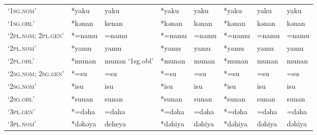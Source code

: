 \begin{landscape}
\begin{longtable}[c]{@{}p{3cm}<{\raggedright}p{2.75cm}<{\raggedright}p{2.75cm}<{\raggedright}p{2.75cm}<{\raggedright}p{2.75cm}<{\raggedright}p{2.75cm}<{\raggedright}p{2.75cm}<{\raggedright}p{2.75cm}<{\raggedright}@{}}
`\textsc{1sg.nom}'                                   & *yaku        & yaku                          & *yaku          & yaku                       & *yaku            & yaku                     & yaku                              \\
`\textsc{1sg.obl}'                                   & *kənan       & kenan                         & *kənan         & kənan                      & *kənan           & kənan                    & kənan                             \\
`\textsc{2pl.nom; 2pl.gen}'                          & *=namu       & =namu                         & *=namu         & =namu                      & *=namu           & =namu                    & =namu                             \\
`\textsc{2pl.nom}'                                   & *yamu        & yamu                          & *yamu          & yamu                       & *yamu            & yamu                     & yamu                              \\
`\textsc{2pl.obl}'                                   & *munan       & munan `1sg.obl'               & *munan         & munan                      & *munan           & munan                    & munan                             \\
`\textsc{2sg.nom; 2sg.gen}'                          & *=su         & =su                           & *=su           & =su                        & *=su             & =su                      & =su                               \\
`\textsc{2sg.nom}'                                   & *isu         & isu                           & *isu           & isu                        & *isu             & isu                      & isu                               \\
`\textsc{2sg.obl}'                                   & *sunan       & sunan                         & *sunan         & sunan                      & *sunan           & sunan                    & sunan                             \\
`\textsc{3pl.gen}'                                   & *=dəha       & =daha                         & *=dəha         & =dəha                      & *=dəha           & =dəha                    & =dəha                             \\
`\textsc{3pl.nom}'                                   & *dəhəya      & deheya                        & *dəhiya        & dəhiya                     & *dəhiya          & dəhiya                   & dəhiya                            \\

\end{longtable}
\end{landscape}
